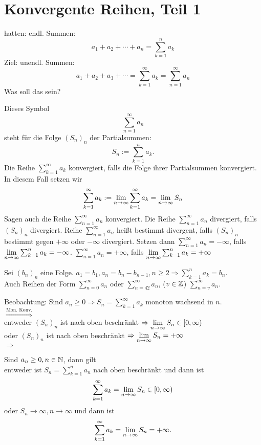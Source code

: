 \documentclass[../ana1.tex]{subfiles}
\begin{document}
\setcounter{section}{10}

\section{Konvergente Reihen, Teil 1}
hatten: endl. Summen: \[ a_1+a_2+\cdots+a_n = \sum_{k=1}^{n}a_k \]
Ziel: unendl. Summen: \[ a_1+a_2+a_3+\cdots = \sum_{k=1}^{\infty}a_k = \sum_{n=1}^{\infty}a_n \]
Was soll das sein?
\begin{defi}
	Dieses Symbol \[ \sum_{n=1}^{\infty}a_n \] steht für die Folge \({(S_n)}_n\) der Partialsummen: \[S_n := \sum_{k=1}^{n}a_k .\]
	Die Reihe \( \sum_{k=1}^{\infty}a_k \) konvergiert, falls die Folge ihrer Partialsummen konvergiert. In diesem Fall setzen wir 
	\[ \sum_{k=1}^{\infty}a_k := \lim\limits_{n\rightarrow\infty} \sum_{k=1}^{\infty}a_k = \lim\limits_{n\rightarrow\infty} S_n \]
	Sagen auch die Reihe \( \sum_{n=1}^{\infty}a_n \) konvergiert. Die Reihe \( \sum_{n=1}^{\infty}a_n \) divergiert, falls \( {(S_n)}_n \) divergiert. Reihe \( \sum_{n=1}^{\infty}a_n \) heißt bestimmt divergent, falls \({(S_n)}_n\) bestimmt gegen \(+ \infty \) oder \(-\infty \) divergiert. Setzen dann \( \sum_{n=1}^{\infty}a_n =-\infty \), falls \(\lim\limits_{n\rightarrow\infty} \sum_{k=1}^{n}a_k = -\infty \). \( \sum_{n=1}^{\infty}a_n = +\infty \), falls \( \lim\limits_{n\rightarrow\infty}\sum_{k=1}^{n}a_k=+\infty \)
\end{defi}
\begin{bem}
	Sei \({(b_n)}_n\) eine Folge. \(a_1 = b_1, a_n = b_n-b_{n-1}, n\geq 2 \Rightarrow \sum_{k=1}^{n}a_k = b_n \).\\
	Auch Reihen der Form \( \sum_{n=0}^{\infty}a_n \) oder \( \sum_{n=42}^{\infty}a_n\), (\(v\in\mathbb{Z} \)) \(\sum_{n=v}^{\infty}a_n\).
\end{bem}
Beobachtung: Sind \(a_n \geq 0 \Rightarrow S_n = \sum_{k=1}^{\infty}a_k \) monoton wachsend in \(n\).\\
\( \overset{\text{Mon. Konv.}}{\Rightarrow}\) \\
entweder \({(S_n)}_n\) ist nach oben beschränkt \( \Rightarrow \lim\limits_{n\rightarrow\infty} S_n \in [0,\infty) \) \\
oder \({(S_n)}_n\) ist nach oben beschränkt \( \Rightarrow \lim\limits_{n\rightarrow\infty} S_n  = +\infty \) \\
\( \Rightarrow \)
\begin{satz}
	Sind \(a_n \geq 0, n\in\mathbb{N} \), dann gilt\\
	entweder ist \(S_n = \sum_{k=1}^{n}a_n\) nach oben beschränkt und dann ist \[ \sum_{k=1}^{\infty}a_k = \lim\limits_{n\rightarrow\infty}S_n \in [0,\infty) \]
	oder \(S_n \rightarrow \infty, n\rightarrow\infty \) und dann ist \[ \sum_{k=1}^{\infty}a_k = \lim\limits_{n\rightarrow\infty}S_n = +\infty. \]
\end{satz}
\end{document}
